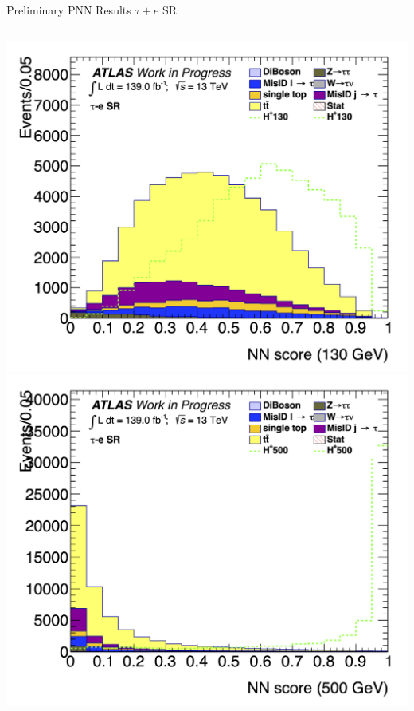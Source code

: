 \documentclass[aspectratio=169,xcolor=table]{beamer}
\begin{document}
\begin{frame}[t]{Preliminary PNN Results $\tau+e$ SR}
\begin{columns}[t]
        \includegraphics[height=.43\textheight,keepaspectratio=true]{Scores/taulep/myOutDirClfEval_1p_noUpsilon_test_full/clf_score_GB200_mass_130to130_SR_TAUEL.png}
        \includegraphics[height=.43\textheight,keepaspectratio=true]{Scores/taulep/myOutDirClfEval_1p_noUpsilon_test_full/clf_score_GB200_mass_500to500_SR_TAUEL.png}


\end{columns}
\end{frame}
\end{document}
